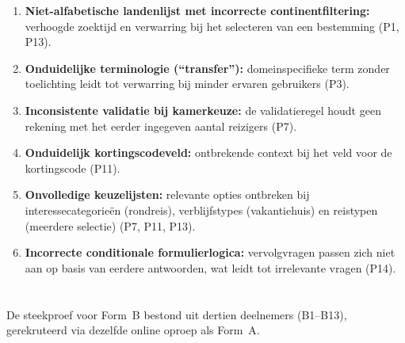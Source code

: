 \begin{enumerate}
  \item \textbf{Niet-alfabetische landenlijst met incorrecte continentfiltering:} verhoogde zoektijd en verwarring bij het selecteren van een bestemming (P1, P13).
  \item \textbf{Onduidelijke terminologie (``transfer''):} domeinspecifieke term zonder toelichting leidt tot verwarring bij minder ervaren gebruikers (P3).
  \item \textbf{Inconsistente validatie bij kamerkeuze:} de validatieregel houdt geen rekening met het eerder ingegeven aantal reizigers (P7).
  \item \textbf{Onduidelijk kortingscodeveld:} ontbrekende context bij het veld voor de kortingscode (P11).
  \item \textbf{Onvolledige keuzelijsten:} relevante opties ontbreken bij interessecategorieën (rondreis), verblijfstypes (vakantiehuis) en reistypen (meerdere selectie) (P7, P11, P13).
  \item \textbf{Incorrecte conditionale formulierlogica:} vervolgvragen passen zich niet aan op basis van eerdere antwoorden, wat leidt tot irrelevante vragen (P14).
\end{enumerate}

\section{}
\label{sec:vroeg-formb}

\subsection{}

De steekproef voor Form~B bestond uit dertien deelnemers (B1–B13), gerekruteerd via dezelfde online oproep als Form~A.

\subsection{}

\subsubsection{}

